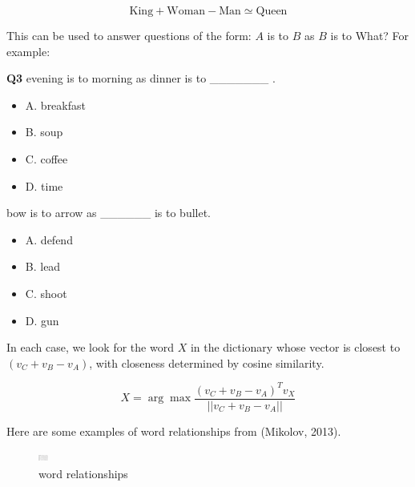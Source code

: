 \documentclass[11pt]{article}
\begin{document}
\[\text{King} + \text{Woman} - \text{Man} \simeq \text{Queen}\]

This can be used to answer questions of the form: $A$ is to $B$ as $B$ is to What?
For example:

\textbf{Q3}
evening is to morning as dinner is to _______ .
\begin{itemize}
  \item A. breakfast
  \item B. soup
  \item C. coffee
  \item D. time
\end{itemize}

bow is to arrow as ______ is to bullet.

\begin{itemize}
  \item A. defend
  \item B. lead
  \item C. shoot
  \item D. gun
\end{itemize}

In each case, we look for the word $X$ in the dictionary whose vector is closest to $(v_C + v_B - v_A)$, with closeness determined by cosine similarity.

\[X = \arg \max \dfrac{(v_C + v_B -v_A)^T v_X}{||v_C + v_B -v_A||}\]

Here are some examples of word relationships from (Mikolov, 2013).

\begin{figure}[h]
    \centering
    \includegraphics[width=12,height=12]{../out/images/word-relationships}
    \caption[word relationships]{word relationships}
    \label{fig:word relationships}
\end{figure}
\end{document}
